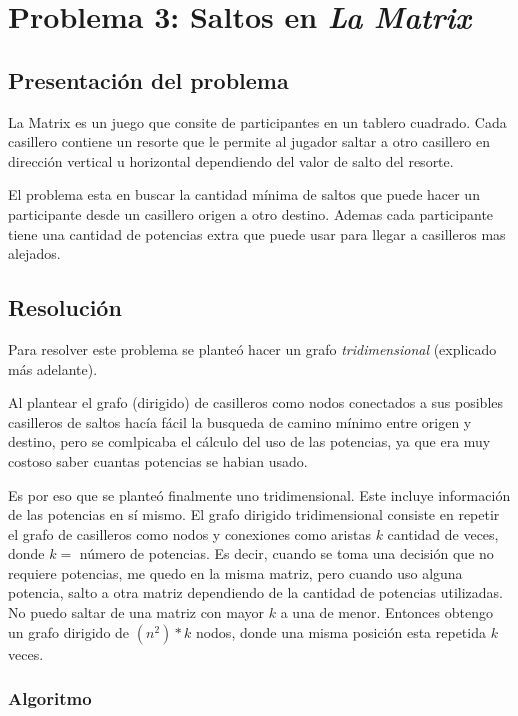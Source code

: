 \section{Problema 3: Saltos en {\it La Matrix}}

\subsection{Presentaci\'on del problema}

La Matrix es un juego que consite de participantes en un tablero cuadrado. Cada casillero contiene un resorte que le permite al jugador saltar a otro casillero en direcci\'on vertical u horizontal dependiendo del valor de salto del resorte.

El problema esta en buscar la cantidad m\'inima de saltos que puede hacer un participante desde un casillero origen a otro destino. Ademas cada participante tiene una cantidad de potencias extra que puede usar para llegar a casilleros mas alejados.

\subsection{Resoluci\'on}

Para resolver este problema se plante\'o hacer un grafo \textit{tridimensional} (explicado m\'as adelante). 

Al plantear el grafo (dirigido) de casilleros como nodos conectados a sus posibles casilleros de saltos hac\'ia f\'acil la busqueda de camino m\'inimo entre origen y destino, pero se comlpicaba el c\'alculo del uso de las potencias, ya que era muy costoso saber cuantas potencias se habian usado.

Es por eso que se plante\'o finalmente uno tridimensional. Este incluye informaci\'on de las potencias en s\'i mismo.
El grafo dirigido tridimensional consiste en repetir el grafo de casilleros como nodos y conexiones como aristas $k$ cantidad de veces, donde $k =$ n\'umero de potencias.
Es decir, cuando se toma una decisi\'on que no requiere potencias, me quedo en la misma matriz, pero cuando uso alguna potencia, salto a otra matriz dependiendo de la cantidad de potencias utilizadas.
No puedo saltar de una matriz con mayor $k$ a una de menor.
Entonces obtengo un grafo dirigido de $(n^2)*k$ nodos, donde una misma posici\'on esta repetida $k$ veces.

\subsubsection{Algoritmo}

